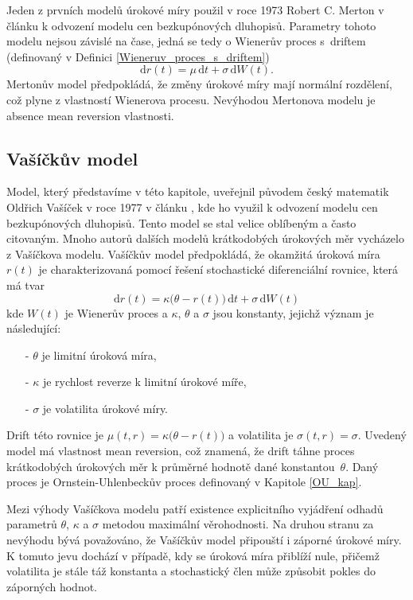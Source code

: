 \documentclass[a4paper,12pt]{report}
\theoremstyle{definition} \newtheorem{definice}[veta]{Definice}
\theoremstyle{remark}
\begin{document}
Jeden z prvních modelů úrokové míry použil v roce 1973 Robert C. Merton v článku \cite{merton1973theory} k odvození modelu cen bezkupónových dluhopisů.
Parametry tohoto modelu nejsou závislé na čase, jedná se tedy o Wienerův proces s~driftem (definovaný v Definici \ref{Wieneruv_proces_s_driftem}) 
\begin{equation}\label{model_urok_miry_Merton}
\mathrm{d}r(t)=\mu\,\mathrm{d}t+\sigma\,\mathrm{d}W(t).
\end{equation}
Mertonův model předpokládá, že změny úrokové míry mají normální rozdělení, což plyne z vlastností Wienerova procesu.
Nevýhodou Mertonova modelu je absence mean reversion vlastnosti.

\subsection{Vašíčkův model}\label{Vasickuv_model_kap}
Model, který představíme v této kapitole, uveřejnil původem český matematik Oldřich Vašíček v roce 1977 v článku \cite{vasicek1977equilibrium}, kde ho využil k odvození modelu cen bezkupónových dluhopisů.
Tento model se stal velice oblíbeným a často citovaným.
Mnoho autorů dalších modelů krátkodobých úrokových měr vycházelo z Vašíčkova modelu.
Vašíčkův model předpokládá, že okamžitá úroková míra $r(t)$ je charakterizovaná pomocí řešení stochastické diferenciální rovnice, která má tvar
\begin{equation}\label{Vasickuv_model}
\mathrm{d}r(t) = \kappa\big(\theta - r(t)\big)\,\mathrm{d}t + \sigma\,\mathrm{d}W(t)
\end{equation}
kde $W(t)$ je Wienerův proces a $\kappa$, $\theta$ a $\sigma$ jsou konstanty, jejichž význam je následující:
\begin{itemize}
\item[-] $\theta$ je limitní úroková míra, 
\item[-] $\kappa$ je rychlost reverze k limitní úrokové míře, 
\item[-] $\sigma$ je volatilita úrokové míry.
\end{itemize}

Drift této rovnice je $\mu(t, r) = \kappa\big ( \theta - r(t)\big)$ a volatilita je $\sigma(t, r) = \sigma$. 
Uvedený model má vlastnost mean reversion, což znamená, že drift táhne proces krátkodobých úrokových měr k průměrné hodnotě dané konstantou~$\theta$. 
Daný proces je Ornstein-Uhlenbeckův proces definovaný v Kapitole \ref{OU_kap}.

Mezi výhody Vašíčkova modelu patří existence explicitního vyjádření odhadů parametrů $\theta$, $\kappa$ a  $\sigma$ metodou maximální věrohodnosti.
Na druhou stranu za nevýhodu bývá považováno, že Vašíčkův model připouští i záporné úrokové míry. 
K tomuto jevu dochází v případě, kdy se úroková míra přiblíží nule, přičemž volatilita je stále táž konstanta a stochastický člen může způsobit pokles do záporných hodnot.
\end{document}

